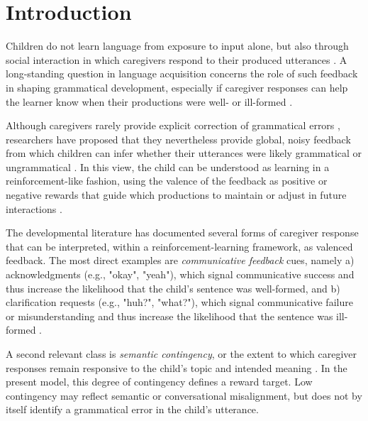 \graphicspath{{ch5/papers/RLHF/}}





\section{Introduction}

Children do not learn language from exposure to input alone, but also through social interaction in which caregivers respond to their produced utterances \cite{fusaroli_caregiver_2023, masek_where_2021, clark_conversational_2020}. A long-standing question in language acquisition concerns the role of such feedback in shaping grammatical development, especially if caregiver responses can  help the learner know when their productions were well- or ill-formed \cite[see review in][]{sokolov_changing_1994}. 

Although caregivers rarely provide explicit correction of grammatical errors \cite{brown_derivational_1970}, researchers have proposed that they nevertheless provide global, noisy feedback from which children can infer whether their utterances were likely grammatical or ungrammatical \cite[e.g.,][]{hirsh-pasek_brown_1984, demetras_feedback_1986, sokolov_changing_1994}. In this view, the child can be understood as learning in a reinforcement-like fashion, using the valence of the feedback as positive or negative rewards that guide which productions to maintain or adjust in future interactions \cite[e.g., see][]{whitehurst_what_1988, nikolaus_communicative_2023, schoneberger_three_2010}.

The developmental literature has documented several forms of caregiver response that can be interpreted, within a reinforcement-learning framework, as valenced feedback. The most direct examples are \textit{communicative feedback} cues, namely a) acknowledgments (e.g., "okay", "yeah"), which signal communicative success and thus increase the likelihood that the child's sentence was well-formed, and b) clarification requests (e.g., "huh?", "what?"), which signal communicative failure or misunderstanding and thus increase the likelihood that the sentence was ill-formed \cite{clark_conversational_2020, demetras_feedback_1986, newport_mother_1977, saxton_prompt_2005, nikolaus_communicative_2023a, nikolaus_communicative_2022}. 

A second relevant class is \textit{semantic contingency}, or the extent to which caregiver responses remain responsive to the child's topic and intended meaning  \cite{hoff-ginsberg_topic_1987, che2018assessing, hirsh2015contribution, agrawal_automatic_2024}. In the present model, this degree of contingency defines a reward target. Low contingency may reflect semantic or conversational misalignment, but does not by itself identify a grammatical error in the child's utterance.


